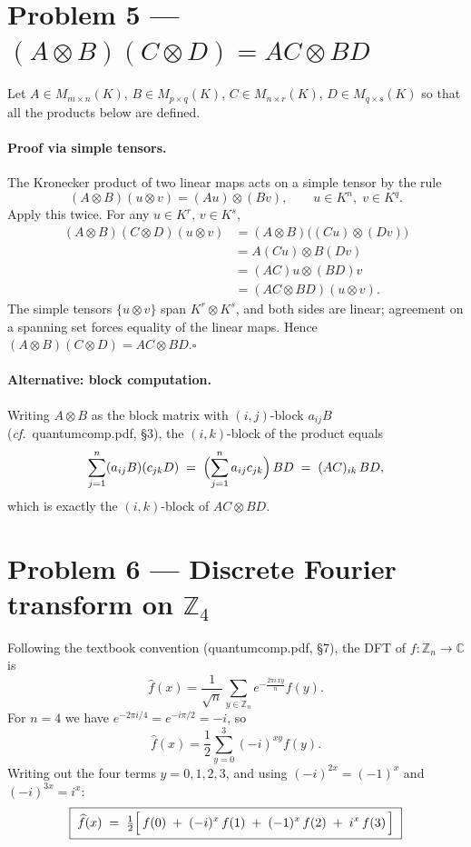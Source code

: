 \documentclass[11pt,a4paper]{article}
\newcommand{\Z}{\mathbb{Z}}
\newcommand{\C}{\mathbb{C}}
\begin{document}
\section*{Problem 5 --- $(A\otimes B)(C\otimes D)=AC\otimes BD$}

Let $A\in M_{m\times n}(K)$, $B\in M_{p\times q}(K)$, $C\in M_{n\times r}(K)$, $D\in M_{q\times s}(K)$ so that all the products below are defined.

\paragraph{Proof via simple tensors.}
The Kronecker product of two linear maps acts on a simple tensor by the rule
\[
(A\otimes B)(u\otimes v)=(Au)\otimes(Bv),
\qquad u\in K^{n},\;v\in K^{q}.
\]
Apply this twice. For any $u\in K^{r}$, $v\in K^{s}$,
\begin{align*}
(A\otimes B)(C\otimes D)(u\otimes v)
&=(A\otimes B)\bigl((Cu)\otimes(Dv)\bigr)\\
&=A(Cu)\otimes B(Dv)\\
&=(AC)u\otimes(BD)v\\
&=(AC\otimes BD)(u\otimes v).
\end{align*}
The simple tensors $\{u\otimes v\}$ span $K^{r}\otimes K^{s}$, and both sides are linear; agreement on a spanning set forces equality of the linear maps. Hence $(A\otimes B)(C\otimes D)=AC\otimes BD$.\hfill$\square$

\paragraph{Alternative: block computation.}
Writing $A\otimes B$ as the block matrix with $(i,j)$-block $a_{ij}B$ (\textit{cf.}\ quantumcomp.pdf, \S3), the $(i,k)$-block of the product equals
\[
\sum_{j=1}^{n}(a_{ij}B)(c_{jk}D)\;=\;\Bigl(\sum_{j=1}^{n}a_{ij}c_{jk}\Bigr)\,BD\;=\;(AC)_{ik}\,BD,
\]
which is exactly the $(i,k)$-block of $AC\otimes BD$.

\section*{Problem 6 --- Discrete Fourier transform on $\Z_4$}

Following the textbook convention (quantumcomp.pdf, \S7), the DFT of $f:\Z_n\to\C$ is
\[
\widehat{f}(x)=\frac{1}{\sqrt{n}}\sum_{y\in\Z_n} e^{-\frac{2\pi i\,xy}{n}}f(y).
\]
For $n=4$ we have $e^{-2\pi i/4}=e^{-i\pi/2}=-i$, so
\[
\widehat{f}(x)=\frac{1}{2}\sum_{y=0}^{3}(-i)^{xy}f(y).
\]
Writing out the four terms $y=0,1,2,3$, and using $(-i)^{2x}=(-1)^{x}$ and $(-i)^{3x}=i^{x}$:
\[
\boxed{\;\widehat{f}(x)\;=\;\tfrac{1}{2}\Bigl[\,f(0)\;+\;(-i)^{x}\,f(1)\;+\;(-1)^{x}\,f(2)\;+\;i^{x}\,f(3)\,\Bigr]\;}
\]
\end{document}
